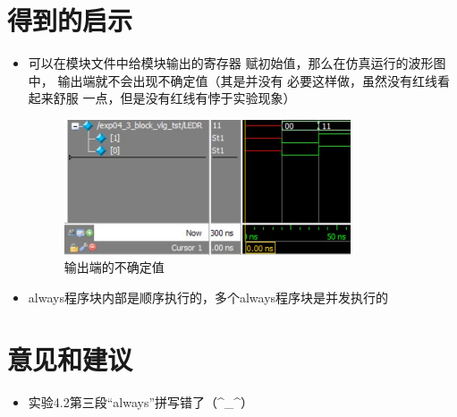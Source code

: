 \documentclass[12pt,a4paper,UTF8]{article}
\begin{document}
\section{得到的启示}
\begin{itemize}
  \item 可以在模块文件中给模块输出的寄存器
        赋初始值，那么在仿真运行的波形图中，
        输出端就不会出现不确定值（其是并没有
        必要这样做，虽然没有红线看起来舒服
        一点，但是没有红线有悖于实验现象）
        \begin{figure}[H]
          \centering
          \includegraphics[width=0.8\textwidth]{bugfix1.JPG}
          \caption{输出端的不确定值}
          \label{bugfix1}
        \end{figure}
  \item always程序块内部是顺序执行的，多个always程序块是并发执行的
\end{itemize}


\section{意见和建议}
\begin{itemize}
  \item 实验4.2第三段``always''拼写错了（\^{}\_\^{}）
\end{itemize}
\end{document}
